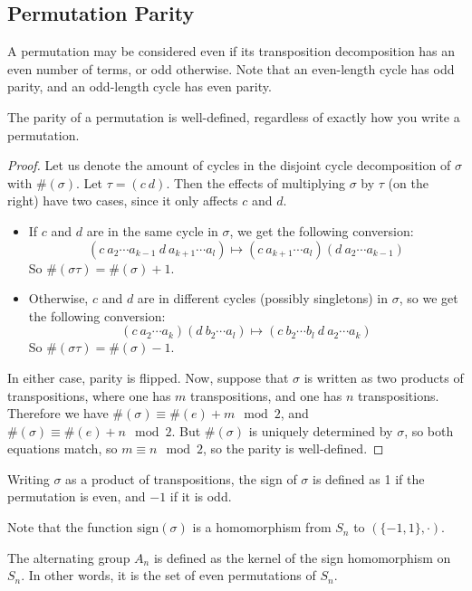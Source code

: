 \subsection{Permutation Parity}
A permutation may be considered even if its transposition decomposition has an even number of terms, or odd otherwise.
Note that an even-length cycle has odd parity, and an odd-length cycle has even parity.
\begin{proposition}
	The parity of a permutation is well-defined, regardless of exactly how you write a permutation.
\end{proposition}
\begin{proof}
	Let us denote the amount of cycles in the disjoint cycle decomposition of \(\sigma\) with \(\#(\sigma)\).
	Let \(\tau = (c\ d)\).
	Then the effects of multiplying \(\sigma\) by \(\tau\) (on the right) have two cases, since it only affects \(c\) and \(d\).
	\begin{itemize}
		\item If \(c\) and \(d\) are in the same cycle in \(\sigma\), we get the following conversion:
		      \[
			      (c\ a_2 \cdots a_{k-1}\ d\ a_{k+1} \cdots a_l) \mapsto (c\ a_{k+1} \cdots a_l) (d\ a_2 \cdots a_{k-1})
		      \]
		      So \(\#(\sigma\tau) = \#(\sigma) + 1\).
		\item Otherwise, \(c\) and \(d\) are in different cycles (possibly singletons) in \(\sigma\), so we get the following conversion:
		      \[
			      (c\ a_2 \cdots a_k) (d\ b_2 \cdots a_l) \mapsto (c\ b_2 \cdots b_l\ d\ a_2 \cdots a_k)
		      \]
		      So \(\#(\sigma\tau) = \#(\sigma) - 1\).
	\end{itemize}
	In either case, parity is flipped.
	Now, suppose that \(\sigma\) is written as two products of transpositions, where one has \(m\) transpositions, and one has \(n\) transpositions.
	Therefore we have \(\#(\sigma) \equiv \#(e) + m \mod 2\), and \(\#(\sigma) \equiv \#(e) + n \mod 2\).
	But \(\#(\sigma)\) is uniquely determined by \(\sigma\), so both equations match, so \(m \equiv n \mod 2\), so the parity is well-defined.
\end{proof}

\begin{definition}
	Writing \(\sigma\) as a product of transpositions, the sign of \(\sigma\) is defined as 1 if the permutation is even, and \(-1\) if it is odd.
\end{definition}
Note that the function \(\mathrm{sign}(\sigma)\) is a homomorphism from \(S_n\) to \((\{-1, 1\}, \cdot)\).

\begin{definition}
	The alternating group \(A_n\) is defined as the kernel of the sign homomorphism on \(S_n\).
	In other words, it is the set of even permutations of \(S_n\).
\end{definition}
